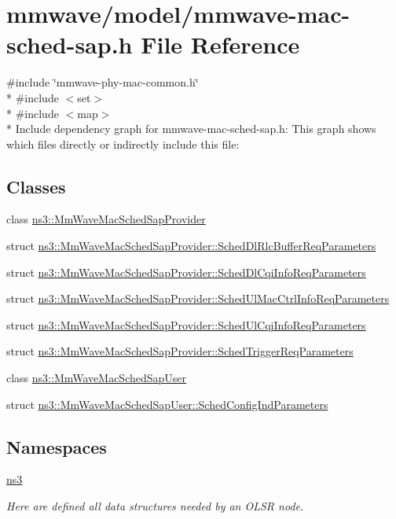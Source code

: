 \hypertarget{mmwave-mac-sched-sap_8h}{}\section{mmwave/model/mmwave-\/mac-\/sched-\/sap.h File Reference}
\label{mmwave-mac-sched-sap_8h}
{\ttfamily \#include \char`\"{}mmwave-\/phy-\/mac-\/common.\+h\char`\"{}}\\*
{\ttfamily \#include $<$set$>$}\\*
{\ttfamily \#include $<$map$>$}\\*
Include dependency graph for mmwave-\/mac-\/sched-\/sap.h\+:
This graph shows which files directly or indirectly include this file\+:
\subsection*{Classes}
\begin{DoxyCompactItemize}
\item 
class \hyperlink{classns3_1_1MmWaveMacSchedSapProvider}{ns3\+::\+Mm\+Wave\+Mac\+Sched\+Sap\+Provider}
\item 
struct \hyperlink{structns3_1_1MmWaveMacSchedSapProvider_1_1SchedDlRlcBufferReqParameters}{ns3\+::\+Mm\+Wave\+Mac\+Sched\+Sap\+Provider\+::\+Sched\+Dl\+Rlc\+Buffer\+Req\+Parameters}
\item 
struct \hyperlink{structns3_1_1MmWaveMacSchedSapProvider_1_1SchedDlCqiInfoReqParameters}{ns3\+::\+Mm\+Wave\+Mac\+Sched\+Sap\+Provider\+::\+Sched\+Dl\+Cqi\+Info\+Req\+Parameters}
\item 
struct \hyperlink{structns3_1_1MmWaveMacSchedSapProvider_1_1SchedUlMacCtrlInfoReqParameters}{ns3\+::\+Mm\+Wave\+Mac\+Sched\+Sap\+Provider\+::\+Sched\+Ul\+Mac\+Ctrl\+Info\+Req\+Parameters}
\item 
struct \hyperlink{structns3_1_1MmWaveMacSchedSapProvider_1_1SchedUlCqiInfoReqParameters}{ns3\+::\+Mm\+Wave\+Mac\+Sched\+Sap\+Provider\+::\+Sched\+Ul\+Cqi\+Info\+Req\+Parameters}
\item 
struct \hyperlink{structns3_1_1MmWaveMacSchedSapProvider_1_1SchedTriggerReqParameters}{ns3\+::\+Mm\+Wave\+Mac\+Sched\+Sap\+Provider\+::\+Sched\+Trigger\+Req\+Parameters}
\item 
class \hyperlink{classns3_1_1MmWaveMacSchedSapUser}{ns3\+::\+Mm\+Wave\+Mac\+Sched\+Sap\+User}
\item 
struct \hyperlink{structns3_1_1MmWaveMacSchedSapUser_1_1SchedConfigIndParameters}{ns3\+::\+Mm\+Wave\+Mac\+Sched\+Sap\+User\+::\+Sched\+Config\+Ind\+Parameters}
\end{DoxyCompactItemize}
\subsection*{Namespaces}
\begin{DoxyCompactItemize}
\item 
 \hyperlink{namespacens3}{ns3}
\begin{DoxyCompactList}\small\item\em Here are defined all data structures needed by an O\+L\+SR node. \end{DoxyCompactList}\end{DoxyCompactItemize}
